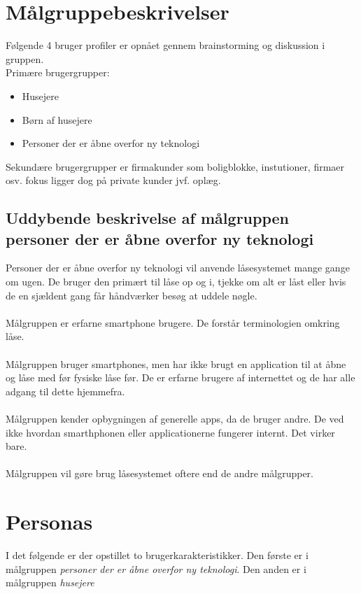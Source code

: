 \documentclass[a4paper,12pt]{article}
\begin{document}
\section{Målgruppebeskrivelser}
Følgende 4 bruger profiler er opnået gennem brainstorming og diskussion i gruppen.
\\
Primære brugergrupper:
\begin{itemize}
    \item Husejere
    \item Børn af husejere
    \item Personer der er åbne overfor ny teknologi
\end{itemize}
Sekundære brugergrupper er firmakunder som boligblokke, instutioner, firmaer osv. fokus ligger dog på private kunder jvf. oplæg.

\subsection{Uddybende beskrivelse af målgruppen personer der er åbne overfor ny teknologi}
Personer der er åbne overfor ny teknologi vil anvende låsesystemet mange gange om ugen. De bruger den primært til låse op og i, tjekke om alt er låst eller hvis de en sjældent gang får håndværker besøg at uddele nøgle.
\\ \\
Målgruppen er erfarne smartphone brugere. De forstår terminologien omkring låse.
\\ \\
Målgruppen bruger smartphones, men har ikke brugt en application til at åbne og låse med før fysiske låse før. De er erfarne brugere af internettet og de har alle adgang til dette hjemmefra.
\\ \\
Målgruppen kender opbygningen af generelle apps, da de bruger andre. De ved ikke hvordan smarthphonen eller applicationerne fungerer internt. Det virker bare.
\\ \\
Målgruppen vil gøre brug låsesystemet oftere end de andre målgrupper.

\section{Personas}
I det følgende er der opstillet to brugerkarakteristikker. Den første er i målgruppen \emph{personer der er åbne overfor ny teknologi}. Den anden er i målgruppen \emph{husejere}
\end{document}
